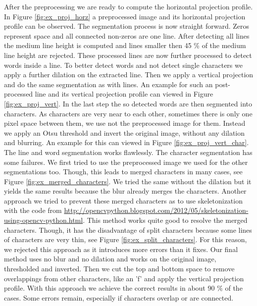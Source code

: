 \documentclass[english, paper=a4]{scrartcl}
\begin{document}
After the preprocessing we are ready to compute the horizontal projection profile. In Figure \ref{fig:ex_proj_horz}
a preprocessed image and its horizontal projection profile can be observed. The segmentation process is now straight forward.
Zeros represent space and all connected non-zeros are one line. After detecting all lines the medium line height is computed
and lines smaller then 45 \% of the medium line height are rejected. 
These processed lines are now further processed to detect words inside a line. To better detect words
and not detect single characters we apply a further dilation on the extracted line. Then we apply a vertical
projection and do the same segmentation as with lines. An example for such an post-processed line and its vertical
projection profile can viewed in Figure \ref{fig:ex_proj_vert}.
In the last step the so detected words are then segmented into characters. As characters are very near to each other,
sometimes there is only one pixel space between them, we use not the preprocessed image for them. 
Instead we apply an Otsu threshold and invert the original image, without any dilation and blurring. 
An example for this can viewed in Figure \ref{fig:ex_proj_vert_char}.
The line and word segmentation works flawlessly. The character segmentation has some failures.
We first tried to use the preprocessed image we used for the other segmentations too.
Though, this leads to merged characters in many cases, see Figure \ref{fig:ex_merged_characters}.
We tried the same without the dilation but it yields the same results because the blur already merges the characters.
Another approach we tried to prevent these merged characters as to use skeletonization with the code
from \url{http://opencvpython.blogspot.com/2012/05/skeletonization-using-opencv-python.html}.
This method works quite good to resolve the merged characters. Though, it has the disadvantage of split characters
because some lines of characters are very thin, see Figure \ref{fig:ex_split_characters}.
For this reason, we rejected this approach as it introduces more errors than it fixes. 
Our final method uses no blur and no dilation and works on the original image, thresholded and inverted.
Then we cut the top and bottom space to remove overlappings from other characters, like an 'f' and apply the 
vertical projection profile. With this approach we achieve the correct results in about 90 \% of the cases.
Some errors remain, especially if characters overlap or are connected.
\end{document}
